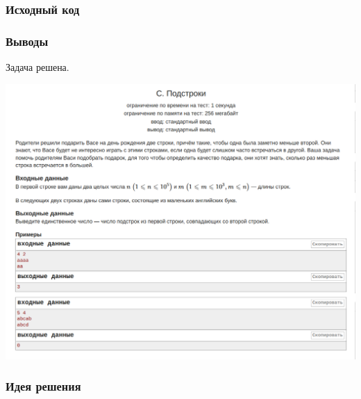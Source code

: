 
\subsubsection*{Исходный код}


\subsubsection*{Выводы}
Задача решена.

\newline

\begin{center}
\includegraphics[width=\textwidth]{statements/Contest1C.png}
\end{center}

\subsubsection*{Идея решения}

